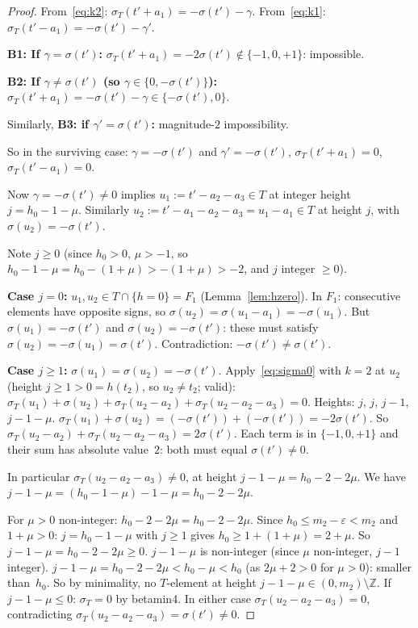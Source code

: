 \documentclass{article}
\begin{document}
\begin{proof}
From~\eqref{eq:k2}: $\sigma_T(t'+a_1)=-\sigma(t')-\gamma$.
From~\eqref{eq:k1}: $\sigma_T(t'-a_1)=-\sigma(t')-\gamma'$.

\textbf{B1: If $\gamma=\sigma(t')$:}
$\sigma_T(t'+a_1)=-2\sigma(t')\notin\{-1,0,+1\}$: impossible.

\textbf{B2: If $\gamma\ne\sigma(t')$ (so $\gamma\in\{0,-\sigma(t')\}$):}
$\sigma_T(t'+a_1)=-\sigma(t')-\gamma\in\{-\sigma(t'),0\}$.

Similarly, \textbf{B3: if $\gamma'=\sigma(t')$:} magnitude-$2$ impossibility.

So in the surviving case: $\gamma=-\sigma(t')$ and $\gamma'=-\sigma(t')$,
$\sigma_T(t'+a_1)=0$, $\sigma_T(t'-a_1)=0$.

Now $\gamma=-\sigma(t')\ne 0$ implies $u_1:=t'-a_2-a_3\in T$ at integer height $j=h_0-1-\mu$.
Similarly $u_2:=t'-a_1-a_2-a_3=u_1-a_1\in T$ at height $j$, with $\sigma(u_2)=-\sigma(t')$.

Note $j\ge 0$ (since $h_0>0$, $\mu>-1$, so $h_0-1-\mu=h_0-(1+\mu)>-(1+\mu)>-2$, and $j$ integer $\ge 0$).

\textbf{Case $j=0$:}
$u_1,u_2\in T\cap\{h=0\}=F_1$ (Lemma~\ref{lem:hzero}).
In $F_1$: consecutive elements have opposite signs, so $\sigma(u_2)=\sigma(u_1-a_1)=-\sigma(u_1)$.
But $\sigma(u_1)=-\sigma(t')$ and $\sigma(u_2)=-\sigma(t')$: these must satisfy $\sigma(u_2)=-\sigma(u_1)=\sigma(t')$.
Contradiction: $-\sigma(t')\ne\sigma(t')$.

\textbf{Case $j\ge 1$:}
$\sigma(u_1)=\sigma(u_2)=-\sigma(t')$.
Apply~\eqref{eq:sigma0} with $k=2$ at $u_2$ (height $j\ge 1>0=h(t_2)$, so $u_2\ne t_2$; valid):
$\sigma_T(u_1)+\sigma(u_2)+\sigma_T(u_2-a_2)+\sigma_T(u_2-a_2-a_3)=0$.
Heights: $j$, $j$, $j-1$, $j-1-\mu$.
$\sigma_T(u_1)+\sigma(u_2)=(-\sigma(t'))+(-\sigma(t'))=-2\sigma(t')$.
So $\sigma_T(u_2-a_2)+\sigma_T(u_2-a_2-a_3)=2\sigma(t')$.
Each term is in $\{-1,0,+1\}$ and their sum has absolute value~$2$:
both must equal $\sigma(t')\ne 0$.

In particular $\sigma_T(u_2-a_2-a_3)\ne 0$, at height $j-1-\mu=h_0-2-2\mu$.
We have $j-1-\mu=(h_0-1-\mu)-1-\mu=h_0-2-2\mu$.

For $\mu>0$ non-integer: $h_0-2-2\mu=h_0-2-2\mu$.
Since $h_0\le m_2-\varepsilon<m_2$ and $1+\mu>0$: $j=h_0-1-\mu$ with $j\ge 1$ gives $h_0\ge 1+(1+\mu)=2+\mu$.
So $j-1-\mu=h_0-2-2\mu\ge 0$.
$j-1-\mu$ is non-integer (since $\mu$ non-integer, $j-1$ integer).
$j-1-\mu=h_0-2-2\mu<h_0-\mu<h_0$ (as $2\mu+2>0$ for $\mu>0$): smaller than~$h_0$.
So by minimality, no $T$-element at height $j-1-\mu\in(0,m_2)\setminus\mathbb{Z}$.
If $j-1-\mu\le 0$: $\sigma_T=0$ by betamin4.
In either case $\sigma_T(u_2-a_2-a_3)=0$, contradicting $\sigma_T(u_2-a_2-a_3)=\sigma(t')\ne 0$.


\end{proof}
\end{document}
